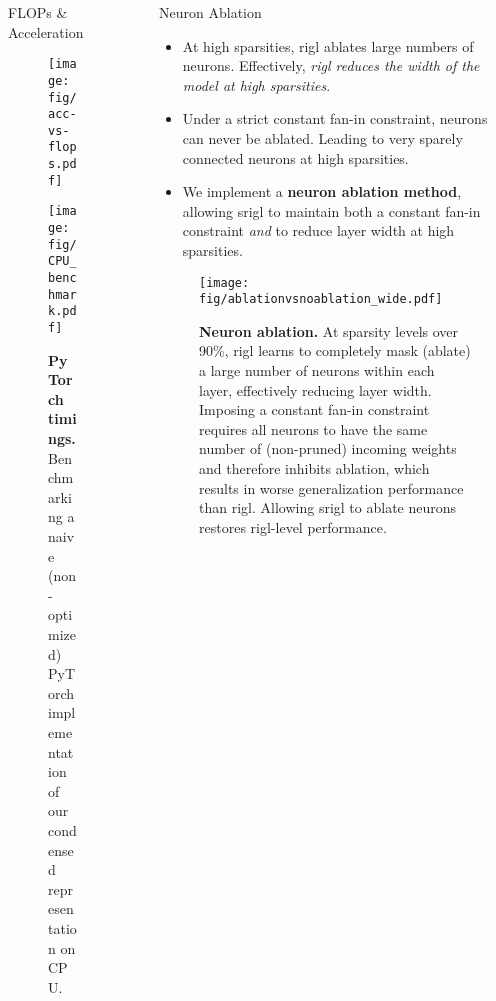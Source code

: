 \documentclass[final]{beamer}
\newlength{\sepwidth}
\newlength{\colwidth}
\newcommand{\separatorcolumn}{\begin{column}{\sepwidth}\end{column}}
\begin{document}
\begin{frame}[t]
\begin{columns}[t]
\begin{column}{\colwidth}
\begin{block}{FLOPs \& Acceleration}

\begin{figure}
    \begin{minipage}[t]{.49\colwidth}
        \centering
        \texttt{[image: fig/acc-vs-flops.pdf]}
        \caption{\textbf{Training \gls{flops}} for \gls{srigl} on ResNet-50/ImageNet at a variety of sparsities compared with dense generalization. \gls{flops} are normalized by dense training \gls{flops}.}\label{fig:combined-flops}
    \end{minipage}
    \hfill
    \begin{minipage}[t]{.49\colwidth}
        \centering
        \texttt{[image: fig/CPU\_benchmark.pdf]}
        \caption{\textbf{PyTorch timings.} Benchmarking a naive (non-optimized) PyTorch implementation of our condensed  representation on CPU.}\label{fig:CPUbenchm}
    \end{minipage}
\end{figure}
\end{block}
\end{column}

\separatorcolumn

\begin{column}{\colwidth}

  \begin{block}{Neuron Ablation}
    \begin{itemize}
        \item At high sparsities, \gls{rigl} ablates large numbers of neurons. Effectively, \emph{\gls{rigl} reduces the width of the model at high sparsities}.
        \item Under a strict constant fan-in constraint, neurons can never be ablated. Leading to very sparely connected neurons at high sparsities.
        \item We implement a \textbf{neuron ablation method}, allowing \gls{srigl} to maintain both a constant fan-in constraint \emph{and} to reduce layer width at high sparsities.
    \end{itemize}

\begin{figure}
    \centering
    \texttt{[image: fig/ablationvsnoablation\_wide.pdf]}
     \caption{\textbf{Neuron ablation.} At sparsity levels over 90\%, \gls{rigl} learns to completely mask (ablate) a large number of neurons within each layer, effectively reducing layer width. Imposing a constant fan-in constraint requires all neurons to have the same number of (non-pruned) incoming weights and therefore inhibits ablation, which results in worse generalization performance than \gls{rigl}. Allowing \gls{srigl} to ablate neurons  restores \gls{rigl}-level performance.}\label{fig:ablationvsnoablation}
\end{figure}


\end{block}
\end{column}
\end{columns}
\end{frame}
\end{document}
